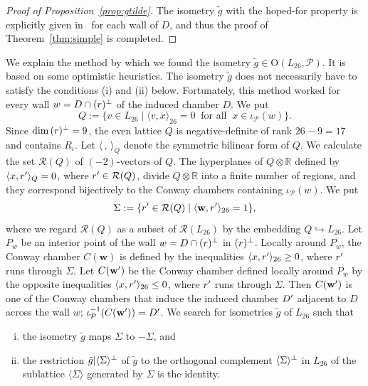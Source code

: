 \documentclass{amsart}
\numberwithin{equation}{section}
\numberwithin{table}{section}
\numberwithin{figure}{section}
\newcommand{\R}{\mathord{\mathbb R}}
\newcommand{\PPP}{\mathord{\mathcal P}}
\newcommand{\RRR}{\mathord{\mathcal R}}
\newcommand{\inj}{\hookrightarrow}
\newcommand{\set}[2]{\{ {#1}\mid {#2}  \}}
\newcommand{\shortset}[2]{\{ {#1} \mid  {#2}   \}}
\newcommand{\gen}[1]{\langle {#1}  \rangle}
\newcommand{\tensor}{\otimes}
\newcommand{\sprime}{\sp\prime}
\newcommand{\sperp}{\sp{\perp}}
\newcommand{\inv}{\sp{-1}}
\newcommand{\OG}{\mathord{\mathrm{O}}}
\newcommand{\weyl}{\mathord{\mathbf w}}
\newcommand{\intfQ}[1]{\langle #1\rangle_{Q}}
\newcommand{\intfLL}[1]{\langle #1\rangle_{26}}
\newcommand{\OGP}[1]{\OG(#1, \PPP)}
\begin{document}
%
\begin{proof}[Proof of Proposition~\ref{prop:gtilde}]
The isometry $\tilde{g}$ with the hoped-for property is explicitly given
in~\cite{thecompdataL10L26} for each wall of $D$,
and thus the proof of Theorem~\ref{thm:simple} is completed.
\end{proof}
%
We explain the method by which  we found the isometry $\tilde{g} \in \OGP{L_{26}}$.
It is based on some optimistic heuristics.
The isometry $\tilde{g}$ does not 
necessarily have to satisfy
the conditions (i) and (ii) below.
Fortunately,  %
this method worked for every wall $w=D\cap (r)\sperp$ of the induced chamber $D$.
We put
\[
Q:=\set{v\in L_{26}}{\intfLL{v, x}=0\;\;\textrm{for all}\;\; x\in \iota_{\PPP}(w)}.
\]
Since $\dim \,(r)\sperp=9$,
the even lattice $Q$ is negative-definite  of rank $26-9=17$
and contains $R_{\iota}$.
Let $\intfQ{\,,\,}$ denote the symmetric bilinear form of $Q$.
We calculate the set $\RRR(Q)$ of $(-2)$-vectors of $Q$.
The hyperplanes of $Q\tensor\R$
defined by $\intfQ{x, r\sprime}=0$, where $r\sprime \in \RRR(Q)$,
divide $Q\tensor\R$ into
a finite number of regions,
and they correspond bijectively
to the Conway chambers containing $\iota_{\PPP}(w)$.
We put
%
\begin{equation}\label{eq:SigmaE}
\Sigma:=\shortset{r\sprime\in \RRR(Q)}{\intfLL{\weyl, r\sprime}=1},
\end{equation}
%
where we regard $\RRR(Q)$ as a subset of $\RRR(L_{26})$ by the embedding  $Q\inj L_{26}$.
Let $P_w$ be an interior point of the wall $w=D\cap (r)\sperp$ in $(r)\sperp$.
Locally around $P_{w}$,
the Conway chamber $C(\weyl)$ is defined by
the inequalities $\intfLL{x, r\sprime}\ge 0$, where $r\sprime$ runs through $\Sigma$.
Let $C(\weyl\sprime)$ be the Conway chamber
defined locally around $P_{w}$
by the opposite inequalities $\intfLL{x, r\sprime}\le 0$,
where $r\sprime$ runs through $\Sigma$.
Then $C(\weyl\sprime)$ is one of the Conway chambers that induce
the induced chamber $D\sprime$ adjacent to $D$ across the wall $w$; $\iota_{\PPP}\inv (C(\weyl\sprime))=D\sprime$.
We search for isometries $\tilde{g}$ of $L_{26}$ such that
%
\begin{enumerate}[(i)]
\item  the isometry $\tilde{g}$ maps $\Sigma$ to $-\Sigma$, and
\item  the restriction $\tilde{g}|\gen{\Sigma}\sperp$ of $\tilde{g}$
to the orthogonal complement $\gen{\Sigma}\sperp$ in $L_{26}$
of the sublattice $\gen{\Sigma}$ generated by $\Sigma$ is the identity.
\end{enumerate}
\end{document}
